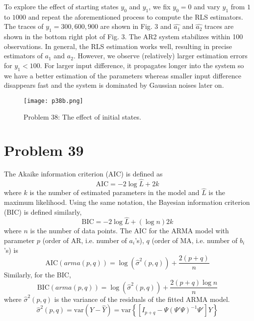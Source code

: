 \documentclass[a4paper, 11pt]{article}
\begin{document}
To explore the effect of starting states $y_0$ and $y_1$, we fix $y_0=0$ and vary $y_1$ from $1$ to $1000$ and repeat the aforementioned process to compute the RLS estimators. The traces of $y_1 = 300, 600, 900$ are shown in Fig. 3 and $\hat{a_1}$ and $\hat{a_2}$ traces are shown in the bottom right plot of Fig. 3. The AR2 system stabilizes within 100 observations. In general, the RLS estimation works well, resulting in precise estimators of $a_1$ and $a_2$. However, we observe (relatively) larger estimation errors for $y_1 < 100$. For larger input difference, it propagates longer into the system so we have a better estimation of the parameters whereas smaller input difference disappears fast and the system is dominated by Gaussian noises later on. 

\begin{figure}
	\begin{center}
		\texttt{[image: p38b.png]}
		\caption{Problem 38: The effect of initial states. }
	\end{center}
\end{figure}


 

\section*{Problem 39}

The Akaike information criterion (AIC) is defined as 
\begin{equation}
\text{AIC} = -2\log{\hat{L}} + 2k
\end{equation}
where $k$ is the number of estimated parameters in the model and $\hat{L}$ is the maximum likelihood. Using the same notation, the Bayesian information criterion (BIC) is defined similarly, 
\begin{equation}
\text{BIC} = -2\log{\hat{L}} + (\log{n})2k
\end{equation}
where $n$ is the number of data points. The AIC for the ARMA model with parameter $p$ (order of AR, i.e. number of $a_i$'s), $q$ (order of MA, i.e. number of $b_i$'s) is 
\begin{equation}
\text{AIC}(arma(p,q)) = \log{(\hat{\sigma}^2(p,q))} + \frac{2(p+q)}{n}
\end{equation}
Similarly, for the BIC, 
\begin{equation}
\text{BIC}(arma(p,q)) = \log{(\hat{\sigma}^2(p,q))} + \frac{2(p+q)\log{n}}{n}
\end{equation}
where $\hat{\sigma}^2(p,q)$ is the variance of the residuals of the fitted ARMA model.
\begin{equation}
\hat{\sigma}^2(p,q) = \text{var}(Y - \hat{Y}) = \text{var}\left\{ \left[ I_{p+q} - \Psi (\Psi ' \Psi)^{-1} \Psi ' \right]Y \right\}
\end{equation}
\end{document}
